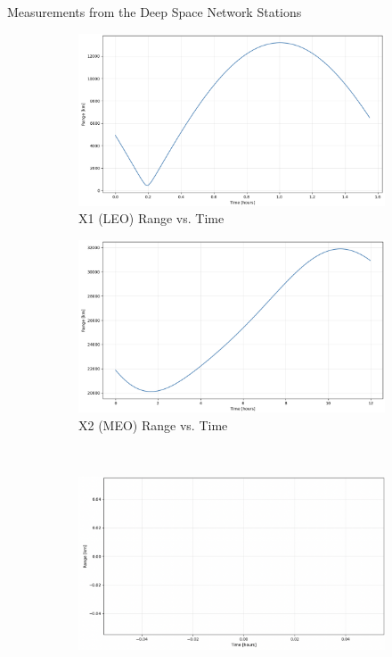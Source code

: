 \begin{hwkProblem}{4}{Measurements from the Deep Space Network Stations}
	\hwkPart{} \label{hwk:s04b}

	\begin{figure}[H] \label{fig:s04b}
		\begin{center}
			\begin{subfigure}{0.4\textwidth} \label{fig:s04b1}
				\includegraphics[width=\linewidth]{./images/s04b1.png}
				\caption{X1 (LEO) Range vs. Time}
			\end{subfigure}
			\begin{subfigure}{0.4\textwidth} \label{fig:s04b2}
				\includegraphics[width=\linewidth]{./images/s04b2.png}
				\caption{X2 (MEO) Range vs. Time}
			\end{subfigure}
			\\
			\begin{subfigure}{0.4\textwidth} \label{fig:s04b3}
				\includegraphics[width=\linewidth]{./images/s04b3.png}

\end{subfigure}
\end{center}
\end{figure}
\end{hwkProblem}
